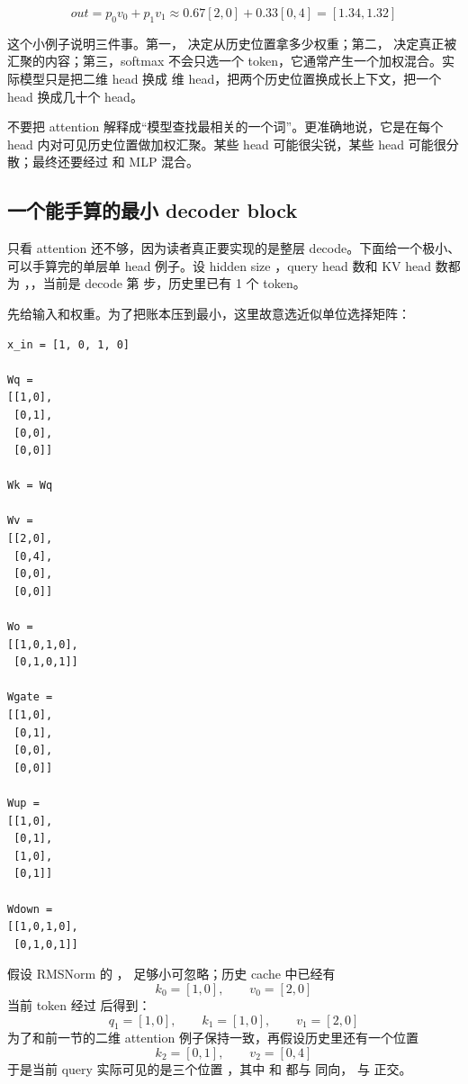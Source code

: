 \[
out=p_0v_0+p_1v_1\approx 0.67[2,0]+0.33[0,4]=[1.34,1.32]
\]

这个小例子说明三件事。第一， 决定从历史位置拿多少权重；第二， 决定真正被汇聚的内容；第三，softmax 不会只选一个 token，它通常产生一个加权混合。实际模型只是把二维 head 换成  维 head，把两个历史位置换成长上下文，把一个 head 换成几十个 head。

\begin{warningbox}
不要把 attention 解释成“模型查找最相关的一个词”。更准确地说，它是在每个 head 内对可见历史位置做加权汇聚。某些 head 可能很尖锐，某些 head 可能很分散；最终还要经过  和 MLP 混合。
\end{warningbox}

\subsection{一个能手算的最小 decoder block}

只看 attention 还不够，因为读者真正要实现的是整层 decode。下面给一个极小、可以手算完的单层单 head 例子。设 hidden size ，query head 数和 KV head 数都为 ，，当前是 decode 第  步，历史里已有 1 个 token。

先给输入和权重。为了把账本压到最小，这里故意选近似单位选择矩阵：

\begin{lstlisting}[numbers=none,caption={最小 decoder block 的输入与权重}]
x_in = [1, 0, 1, 0]

Wq =
[[1,0],
 [0,1],
 [0,0],
 [0,0]]

Wk = Wq

Wv =
[[2,0],
 [0,4],
 [0,0],
 [0,0]]

Wo =
[[1,0,1,0],
 [0,1,0,1]]

Wgate =
[[1,0],
 [0,1],
 [0,0],
 [0,0]]

Wup =
[[1,0],
 [0,1],
 [1,0],
 [0,1]]

Wdown =
[[1,0,1,0],
 [0,1,0,1]]
\end{lstlisting}

假设 RMSNorm 的 \code{\gamma=[1,1,1,1]}，\code{\epsilon} 足够小可忽略；历史 cache 中已经有
\[
k_0=[1,0],\qquad v_0=[2,0]
\]
当前 token 经过  后得到：
\[
q_1=[1,0],\qquad k_1=[1,0],\qquad v_1=[2,0]
\]
为了和前一节的二维 attention 例子保持一致，再假设历史里还有一个位置
\[
k_2=[0,1],\qquad v_2=[0,4]
\]
于是当前 query 实际可见的是三个位置 ，其中  和  都与  同向， 与  正交。

